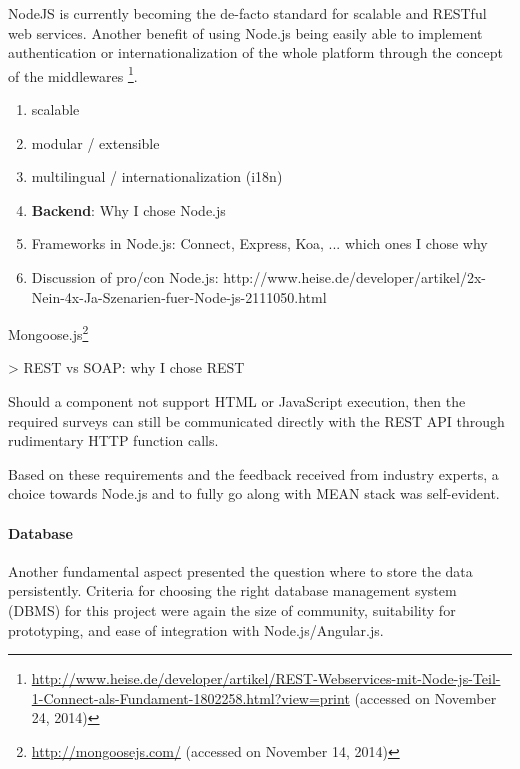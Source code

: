 {		%
		NodeJS is currently becoming the de-facto standard for scalable and RESTful web services. Another benefit of using Node.js being easily able to implement authentication or internationalization of the whole platform through the concept of the middlewares \footnote{\url{http://www.heise.de/developer/artikel/REST-Webservices-mit-Node-js-Teil-1-Connect-als-Fundament-1802258.html?view=print} (accessed on November 24, 2014)}. 

			\begin{enumerate}[itemsep=0pt] 
			\item scalable
			\item modular / extensible
			\item multilingual / internationalization (i18n)

	        \item \textbf{Backend}: Why I chose Node.js
	        \item Frameworks in Node.js: Connect, Express, Koa, ... which ones I chose why
	        \item Discussion of pro/con Node.js: http://www.heise.de/developer/artikel/2x-Nein-4x-Ja-Szenarien-fuer-Node-js-2111050.html
			\end{enumerate}


		Mongoose.js\footnote{\url{http://mongoosejs.com/} (accessed on November 14, 2014)}



	
		> REST vs SOAP: why I chose REST

		Should a component not support HTML or JavaScript execution, then the required surveys can still be communicated directly with the REST API through rudimentary HTTP function calls.

		Based on these requirements and the feedback received from industry experts, a choice towards Node.js and to fully go along with MEAN stack was self-evident.




	\paragraph{Database}

		Another fundamental aspect presented the question where to store the data persistently. Criteria for choosing the right database management system (DBMS) for this project were again the size of community, suitability for prototyping, and ease of integration with Node.js/Angular.js.

}

